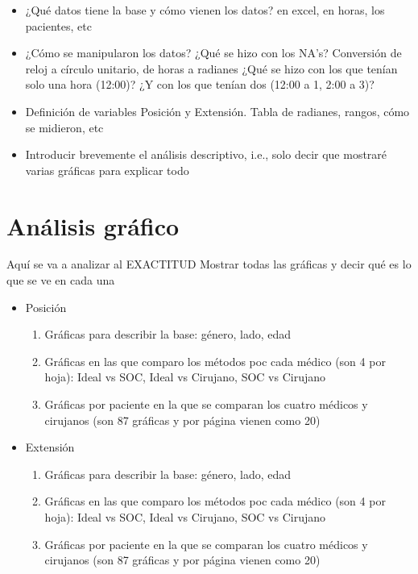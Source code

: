 \documentclass{article}
\begin{document}
\begin{itemize}
			
			
			
			
			
			
			
			
			
			
			
			
			
			
			
			
			
			
			
			
			
			
			
			
			
			
			
			\item ¿Qué datos tiene la base y cómo vienen los datos? en excel, en horas, los pacientes, etc
			\item ¿Cómo se manipularon los datos? ¿Qué se hizo con los NA's? Conversión de reloj a círculo unitario, de horas a radianes ¿Qué se hizo con los que tenían solo una hora (12:00)? ¿Y con los que tenían dos (12:00 a 1, 2:00 a 3)?
			\item Definición de variables Posición y Extensión. Tabla de radianes, rangos, cómo se midieron, etc
			\item Introducir brevemente el análisis descriptivo, i.e., solo decir que mostraré varias gráficas para explicar todo
		\end{itemize}
		
	\section{Análisis gráfico}
	Aquí se va a analizar al EXACTITUD
	Mostrar todas las gráficas y decir qué es lo que se ve en cada una
		
		\begin{itemize}
			\item Posición
				\begin{enumerate}
					\item Gráficas para describir la base: género, lado, edad 
					\item Gráficas en las que comparo los métodos poc cada médico (son 4 por hoja): Ideal vs SOC, Ideal vs Cirujano, SOC vs Cirujano
					\item Gráficas por paciente en la que se comparan los cuatro médicos y cirujanos (son 87 gráficas y por página vienen como 20)
				\end{enumerate}	
			\item Extensión
				\begin{enumerate}
					\item Gráficas para describir la base: género, lado, edad 
					\item Gráficas en las que comparo los métodos poc cada médico (son 4 por hoja): Ideal vs SOC, Ideal vs Cirujano, SOC vs Cirujano
					\item Gráficas por paciente en la que se comparan los cuatro médicos y cirujanos (son 87 gráficas y por página vienen como 20)				
				\end{enumerate}			
		\end{itemize}
	
\end{document}
